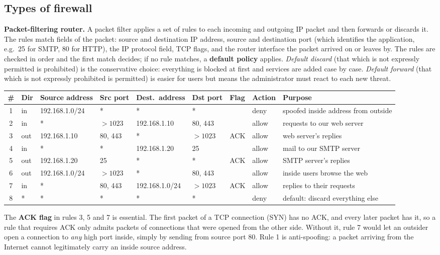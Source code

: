 \subsection{Types of firewall \hot\new}

\textbf{Packet-filtering router.} A packet filter applies a set of rules to each incoming and outgoing IP packet and then forwards or discards it. The rules match fields of the packet: source and destination IP address, source and destination port (which identifies the application, e.g.\ 25 for SMTP, 80 for HTTP), the IP protocol field, TCP flags, and the router interface the packet arrived on or leaves by. The rules are checked in order and the first match decides; if no rule matches, a \textbf{default policy} applies. \emph{Default discard} (that which is not expressly permitted is prohibited) is the conservative choice: everything is blocked at first and services are added case by case. \emph{Default forward} (that which is not expressly prohibited is permitted) is easier for users but means the administrator must react to each new threat.

\begin{center}\small\setlength{\tabcolsep}{4pt}
\begin{tabular}{@{}c l l l l l l l l@{}}
\toprule
\# & Dir & Source address & Src port & Dest.\ address & Dst port & Flag & Action & Purpose\\
\midrule
1 & in & 192.168.1.0/24 & * & * & * & & deny & spoofed inside address from outside\\
2 & in & * & $>1023$ & 192.168.1.10 & 80, 443 & & allow & requests to our web server\\
3 & out & 192.168.1.10 & 80, 443 & * & $>1023$ & ACK & allow & web server's replies\\
4 & in & * & * & 192.168.1.20 & 25 & & allow & mail to our SMTP server\\
5 & out & 192.168.1.20 & 25 & * & * & ACK & allow & SMTP server's replies\\
6 & out & 192.168.1.0/24 & $>1023$ & * & 80, 443 & & allow & inside users browse the web\\
7 & in & * & 80, 443 & 192.168.1.0/24 & $>1023$ & ACK & allow & replies to their requests\\
8 & * & * & * & * & * & & deny & default: discard everything else\\
\bottomrule
\end{tabular}
\end{center}
The \textbf{ACK flag} in rules 3, 5 and 7 is essential. The first packet of a TCP connection (SYN) has no ACK, and every later packet has it, so a rule that requires ACK only admits packets of connections that were opened from the other side. Without it, rule 7 would let an outsider open a connection to \emph{any} high port inside, simply by sending from source port 80. Rule 1 is anti-spoofing: a packet arriving from the Internet cannot legitimately carry an inside source address.

